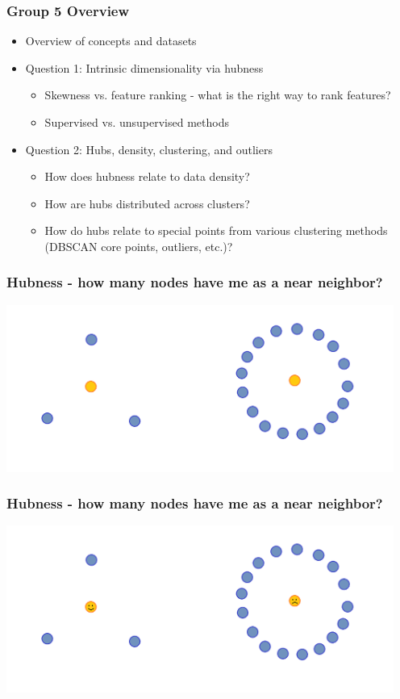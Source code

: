 \documentclass{beamer}
\begin{document}
\begin{frame}
\frametitle{Group 5 Overview}

\begin{itemize}
\item Overview of concepts and datasets
\item Question 1: Intrinsic dimensionality via hubness
\begin{itemize}
\item{Skewness vs. feature ranking - what is the right way to rank features?}
\item{Supervised vs. unsupervised methods} 
\end{itemize}
\item Question 2: Hubs, density, clustering, and outliers
\begin{itemize}
\item How does hubness relate to data density?
\item How are hubs distributed across clusters?
\item How do hubs relate to special points from various clustering methods (DBSCAN core points, outliers, etc.)?
\end{itemize}
\end{itemize}

\end{frame}


\begin{frame}
\frametitle{Hubness - how many nodes have me as a near neighbor?}

\centering
\includegraphics[width=5in]{./fig/hubness_def_1.png}

\end{frame}

\begin{frame}
\frametitle{Hubness - how many nodes have me as a near neighbor?}

\centering
\includegraphics[width=5in]{./fig/hubness_def_2.png}

\end{frame}
\end{document}
